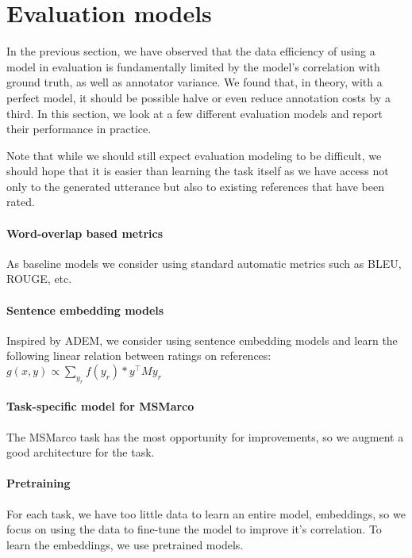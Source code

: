 \section{\label{sec:models} Evaluation models}
In the previous section, we have observed that the data efficiency of using a model in evaluation is fundamentally limited by the model's correlation with ground truth, as well as annotator variance.
We found that, in theory, with a perfect model, it should be possible halve or even reduce annotation costs by a third.
In this section, we look at a few different evaluation models and report their performance in practice.

Note that while we should still expect evaluation modeling to be difficult, we should hope that it is easier than learning the task itself as we have access not only to the generated utterance but also to existing references that have been rated.

\paragraph{Word-overlap based metrics}
As baseline models we consider using standard automatic metrics such as BLEU, ROUGE, etc.

\paragraph{Sentence embedding models}
Inspired by ADEM, we consider using sentence embedding models and learn the following linear relation between ratings on references:
$g(x,y) \propto \sum_{y_r} f(y_r) * y^\top M y_r$

\paragraph{Task-specific model for MSMarco}
The MSMarco task has the most opportunity for improvements, so we augment a good architecture for the task.

\paragraph{Pretraining}
For each task, we have too little data to learn an entire model, embeddings, so we focus on using the data to fine-tune the model to improve it's correlation. 
To learn the embeddings, we use pretrained models.

